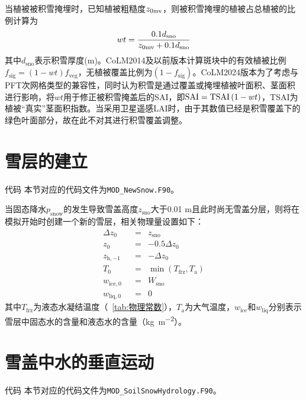 当植被被积雪掩埋时，已知植被粗糙度$z_{\rm 0mv}$，则被积雪掩埋的植被占总植被的比例计算为
\begin{equation}
  wt=\frac{0.1 d_{\mathrm{{sno}}}}{z_{\rm 0mv}+0.1 d_{\mathrm{{sno}}}}
\end{equation}
其中$d_{\mathrm{sno}}$表示积雪厚度(m)。CoLM2014及以前版本计算斑块中的有效植被比例$f_{\mathrm{sig}}=\left(1-wt\right)f_{\mathrm{veg}}$，无植被覆盖比例为$\left(1-f_{\mathrm{sig}}\right)$。CoLM2024版本为了考虑与PFT次网格类型的兼容性，同时认为积雪是通过覆盖或掩埋植被叶面积、茎面积进行影响，将$wt$用于修正被积雪掩盖后的SAI，即${\rm SAI=TSAI}\left(1-wt\right)$，TSAI为植被“真实”茎面积指数。当采用卫星遥感LAI时，由于其数值已经是积雪覆盖下的绿色叶面部分，故在此不对其进行积雪覆盖调整。


\section{雪层的建立}\label{sec:雪层的建立}
\begin{mymdframed}{代码}
  本节对应的代码文件为\texttt{MOD\_NewSnow.F90}。
\end{mymdframed}


当固态降水$p_{\mathrm{snow}}$的发生导致雪盖高度$z_{\mathrm{sno}}$大于0.01 m且此时尚无雪盖分层，则将在模拟开始时创建一个新的雪层，相关物理量设置如下：
\begin{equation}
  \begin{aligned}
    & \Delta z_{0} &&= &{z}_{\mathrm{sno}}& \\
    & z_0 &&= &-0.5\Delta z_0& \\
    & z_{\mathrm{h,-1}} &&= &-\Delta z_0& \\
    & T_0 &&= &\min \left(T_{\mathrm {frz}} ,T_{\mathrm{a}}\right)& \\
    & w_{\mathrm{ice,0}} &&= &W_{\mathrm{sno}}& \\
    & w_{\mathrm{liq,0}} &&= &0&
  \end{aligned}
\end{equation}
其中$T_{\mathrm {frz}} $为液态水凝结温度（~\ref{tab:物理常数}），$T_{\mathrm{a}}$为大气温度，$w_{\mathrm{ice}}$和$w_{\mathrm{liq}}$分别表示雪层中固态水的含量和液态水的含量（\unit{kg.m^{-2}}）。

\section{雪盖中水的垂直运动}\label{雪盖的水量平衡}
\begin{mymdframed}{代码}
  本节对应的代码文件为\texttt{MOD\_SoilSnowHydrology.F90}。
\end{mymdframed}

